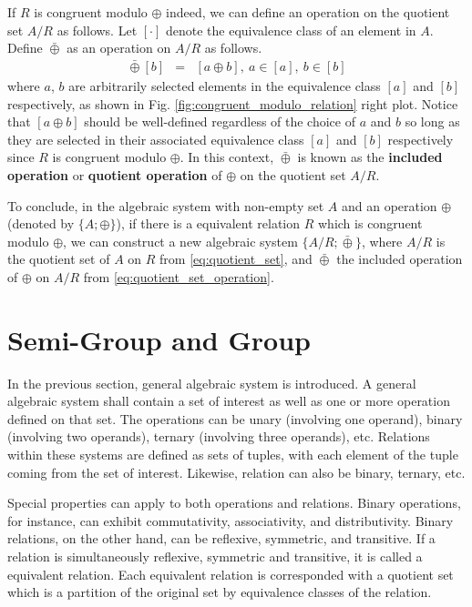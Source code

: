 If $R$ is congruent modulo $\oplus$ indeed, we can define an operation on the quotient set $A/R$ as follows. Let $[\cdot]$ denote the equivalence class of an element in $A$. Define $\bar{\oplus}$ as an operation on $A/R$ as follows.
\begin{eqnarray}
	[a] \bar{\oplus} [b] &=& [a\oplus b], ~a\in[a], ~b\in [b] \label{eq:quotient_set_operation}
\end{eqnarray}
where $a$, $b$ are arbitrarily selected elements in the equivalence class $[a]$ and $[b]$ respectively, as shown in Fig. \ref{fig:congruent_modulo_relation} right plot. Notice that $[a\oplus b]$ should be well-defined regardless of the choice of $a$ and $b$ so long as they are selected in their associated equivalence class $[a]$ and $[b]$ respectively since $R$ is congruent modulo $\oplus$. In this context, $\bar{\oplus}$ is known as the \textbf{included operation} or \textbf{quotient operation} of $\oplus$ on the quotient set $A/R$.

To conclude, in the algebraic system with non-empty set $A$ and an operation $\oplus$ (denoted by $\{A; \oplus\}$), if there is a equivalent relation $R$ which is congruent modulo $\oplus$, we can construct a new algebraic system $\{A/R; \bar{\oplus}\}$, where $A/R$ is the quotient set of $A$ on $R$ from \eqref{eq:quotient_set}, and $\bar{\oplus}$ the included operation of $\oplus$ on $A/R$ from \eqref{eq:quotient_set_operation}.

\section{Semi-Group and Group}

In the previous section, general algebraic system is introduced. A general algebraic system shall contain a set of interest as well as one or more operation defined on that set. The operations can be unary (involving one operand), binary (involving two operands), ternary (involving three operands), etc. Relations within these systems are defined as sets of tuples, with each element of the tuple coming from the set of interest. Likewise, relation can also be binary, ternary, etc.

Special properties can apply to both operations and relations. Binary operations, for instance, can exhibit commutativity, associativity, and distributivity. Binary relations, on the other hand, can be reflexive, symmetric, and transitive.  If a relation is simultaneously reflexive, symmetric and transitive, it is called a equivalent relation. Each equivalent relation is corresponded with a quotient set which is a partition of the original set by equivalence classes of the relation.

